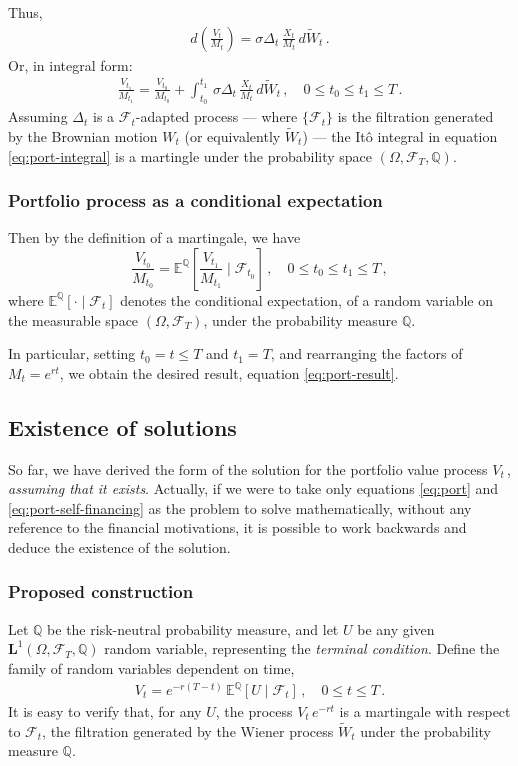 \documentclass[12pt]{article}
\newcommand{\sF}{\mathcal{F}}
\newcommand{\Le}{\mathbf{L}}
\newcommand{\EQ}{\mathbb{E}^\mathbb{Q}}
\newcommand{\PQ}{\mathbb{Q}}
\begin{document}
Thus,
\begin{align*}
d\left(\frac{V_t}{M_t}\right) = \sigma \Delta_t \, \frac{X_t}{M_t} \, d\widetilde{W}_t\,.
\end{align*}
Or, in integral form:
\begin{align}\label{eq:port-integral}
\frac{V_{t_1}}{M_{t_1}} = \frac{V_{t_0}}{M_{t_0}} + \int_{t_0}^{t_1} \, \sigma \Delta_t \, \frac{X_t}{M_t} \, d\widetilde{W}_t\,, \quad 0 \leq t_0 \leq t_1 \leq T\,.
\end{align}
Assuming $\Delta_t$ is a $\sF_t$-adapted process
--- where $\{ \sF_t \}$ is the filtration generated by the Brownian
motion $W_t$ (or equivalently $\widetilde{W}_t$) ---
the It\^o integral in equation \eqref{eq:port-integral}
is a martingle under the probability space $(\Omega, \sF_T, \PQ)$.

\subsubsection{Portfolio process as a conditional expectation}

Then by the definition of a martingale,
we have
\[
\frac{V_{t_0}}{M_{t_0}} = \EQ \left[ \frac{V_{t_1}}{M_{t_1}} \mid \sF_{t_0} \right]\,, \quad 0 \leq t_0 \leq t_1 \leq T\,,
\]
where $\EQ[ \cdot \mid \sF_t ]$ denotes the conditional 
expectation, of a random variable
on the measurable space $(\Omega, \sF_T)$, 
under
the probability measure $\PQ$.

In particular, setting $t_0 = t \leq T$ and $t_1 = T$,
and rearranging the factors of $M_t = e^{rt}$,
we obtain the desired result, equation \eqref{eq:port-result}.


\subsection{Existence of solutions}
So far,
we have derived the form of the solution for the portfolio value process 
$V_t$\,, 
\emph{assuming that it exists}.
Actually, if we were to take only
equations \eqref{eq:port} and \eqref{eq:port-self-financing}
as the problem to solve mathematically,
without any reference to the financial motivations,
it is possible to work backwards and deduce the existence
of the solution.

\subsubsection{Proposed construction}

Let $\PQ$ be the risk-neutral probability measure,
and let $U$ be any given $\Le^1(\Omega, \sF_T, \PQ)$ random variable,
representing the \emph{terminal condition}.
Define the family of random variables dependent on time,
\begin{align}\label{eq:port-construct}
V_t = e^{-r(T-t)} \, \EQ[ U \mid \sF_t ]\,, \quad 0 \leq t \leq T\,.
\end{align}
It is easy to verify that, for any $U$,
the process $V_t \, e^{-rt}$ is a martingale
with respect to $\sF_t$, the filtration generated 
by the Wiener process $\widetilde{W}_t$ under the probability
measure $\PQ$.
\end{document}
